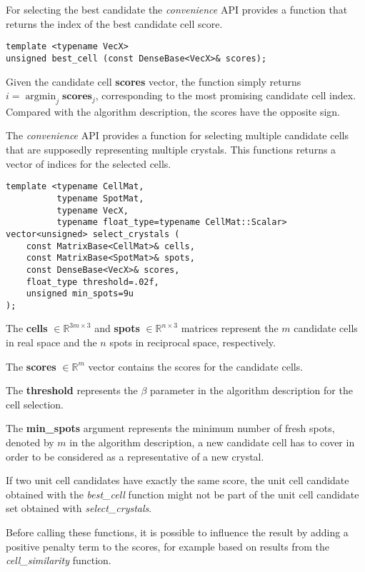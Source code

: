 \documentclass[a4paper,10pt]{article}
\DeclareMathOperator*{\argmin}{argmin}
\newcommand{\vect}[1]{\mathbf{#1}}
\begin{document}
For selecting the best candidate the \emph{convenience} API provides a function that returns the index of the best candidate cell score.

\begin{lstlisting}
template <typename VecX>
unsigned best_cell (const DenseBase<VecX>& scores);
\end{lstlisting}

Given the candidate cell \textbf{scores} vector, the function simply returns $i = \argmin_j \vect{scores}_j$, corresponding to the most promising candidate cell index. Compared with the algorithm description, the scores have the opposite sign.

The \emph{convenience} API provides a function for selecting multiple candidate cells that are supposedly representing multiple crystals. This functions returns a vector of indices for the selected cells.

\begin{lstlisting}
template <typename CellMat,
          typename SpotMat,
          typename VecX,
          typename float_type=typename CellMat::Scalar>
vector<unsigned> select_crystals (
    const MatrixBase<CellMat>& cells,
    const MatrixBase<SpotMat>& spots,
    const DenseBase<VecX>& scores,
    float_type threshold=.02f,
    unsigned min_spots=9u
);
\end{lstlisting}

The \textbf{cells} $\in \mathbb{R}^{3m\times 3}$ and \textbf{spots} $\in \mathbb{R}^{n\times 3}$ matrices represent the $m$ candidate cells in real space and the $n$ spots in reciprocal space, respectively.

The \textbf{scores} $\in \mathbb{R}^m$ vector contains the scores for the candidate cells.

The \textbf{threshold} represents the $\beta$ parameter in the algorithm description for the cell selection.

The \textbf{min\_spots} argument represents the minimum number of fresh spots, denoted by $m$ in the algorithm description, a new candidate cell has to cover in order to be considered as a representative of a new crystal.

If two unit cell candidates have exactly the same score, the unit cell candidate obtained with the \emph{best\_cell} function might not be part of the unit cell candidate set obtained with \emph{select\_crystals}.

Before calling these functions, it is possible to influence the result by adding a positive penalty term to the scores, for example based on results from the \emph{cell\_similarity} function.
\end{document}
